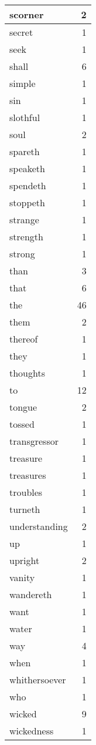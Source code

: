 \begin{center}
\begin{longtable}{l|r}
scorner & 2\\ \hline 
secret & 1\\ \hline 
seek & 1\\ \hline 
shall & 6\\ \hline 
simple & 1\\ \hline 
sin & 1\\ \hline 
slothful & 1\\ \hline 
soul & 2\\ \hline 
spareth & 1\\ \hline 
speaketh & 1\\ \hline 
spendeth & 1\\ \hline 
stoppeth & 1\\ \hline 
strange & 1\\ \hline 
strength & 1\\ \hline 
strong & 1\\ \hline 
than & 3\\ \hline 
that & 6\\ \hline 
the & 46\\ \hline 
them & 2\\ \hline 
thereof & 1\\ \hline 
they & 1\\ \hline 
thoughts & 1\\ \hline 
to & 12\\ \hline 
tongue & 2\\ \hline 
tossed & 1\\ \hline 
transgressor & 1\\ \hline 
treasure & 1\\ \hline 
treasures & 1\\ \hline 
troubles & 1\\ \hline 
turneth & 1\\ \hline 
understanding & 2\\ \hline 
up & 1\\ \hline 
upright & 2\\ \hline 
vanity & 1\\ \hline 
wandereth & 1\\ \hline 
want & 1\\ \hline 
water & 1\\ \hline 
way & 4\\ \hline 
when & 1\\ \hline 
whithersoever & 1\\ \hline 
who & 1\\ \hline 
wicked & 9\\ \hline 
wickedness & 1\\ \hline 

\end{longtable}
\end{center}
